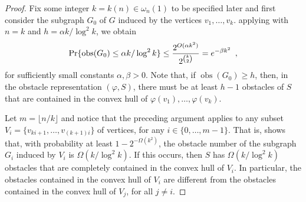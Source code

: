\documentclass{patmorin}
\DeclareMathOperator{\obs}{obs}
\begin{document}
\begin{proof}
  Fix some integer $k=k(n)\in\omega_n(1)$ to be specified later and first
  consider the subgraph $G_0$ of $G$ induced by the vertices $v_1,\ldots,v_k$.
  applying  with $n=k$ and $h=\alpha k/\log^2 k$,
  we obtain
  \begin{equation}
       \Pr\{\obs(G_0) \le \alpha k/\log^2 k\} 
         \le \frac{2^{O(\alpha k^2)}}{2^{\binom{k}{2}}}
         = e^{-\beta k^2} \enspace , \eqlabel{g1}
  \end{equation}
  for sufficiently small constants $\alpha,\beta > 0$.  Note that, if
  $\obs(G_0)\ge h$, then, in the obstacle representation $(\varphi,S)$,
  there must be at least $h-1$ obstacles of $S$ that are contained in the
  convex hull of $\varphi(v_1),\ldots,\varphi(v_k)$.   

  Let $m=\lfloor n/k\rfloor$ and notice that the preceding argument
  applies to any subset $V_i=\{v_{ki+1},\ldots,v_{(k+1)i}\}$ of vertices,
  for any $i\in\{0,\ldots,m-1\}$.  That is,  shows that,
  with probability at least $1-2^{-\Omega(k^2)}$, the obstacle number of
  the subgraph $G_i$ induced by $V_i$ is $\Omega(k/\log^2 k)$.  If this
  occurs, then $S$ has $\Omega(k/\log^2 k)$ obstacles that are completely
  contained in the convex hull of $V_i$.  In particular, the obstacles
  contained in the convex hull of $V_i$ are different from the obstacles
  contained in the convex hull of $V_j$, for all $j\neq i$.


\end{proof}
\end{document}
